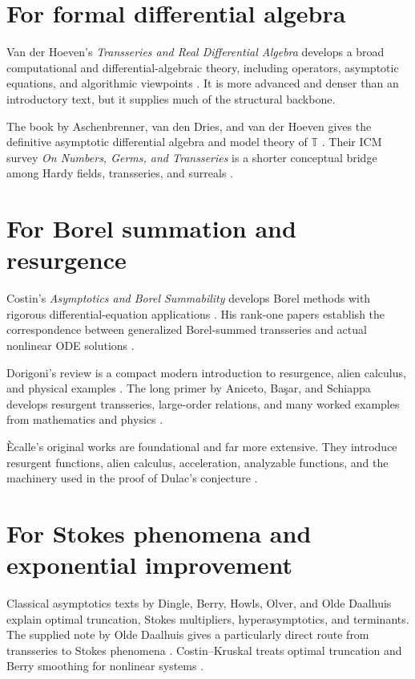 \documentclass[11pt,openany]{book}
\theoremstyle{definition}
\theoremstyle{plain}
\theoremstyle{remark}
\newcommand{\T}{\mathbb{T}}
\begin{document}
\section{For formal differential algebra}

Van der Hoeven's \emph{Transseries and Real Differential Algebra} develops a broad computational and differential-algebraic theory, including operators, asymptotic equations, and algorithmic viewpoints \cite{vdhoeven-book}. It is more advanced and denser than an introductory text, but it supplies much of the structural backbone.

The book by Aschenbrenner, van den Dries, and van der Hoeven gives the definitive asymptotic differential algebra and model theory of $\T$ \cite{adh-book}. Their ICM survey \emph{On Numbers, Germs, and Transseries} is a shorter conceptual bridge among Hardy fields, transseries, and surreals \cite{adh-numbers}.

\section{For Borel summation and resurgence}

Costin's \emph{Asymptotics and Borel Summability} develops Borel methods with rigorous differential-equation applications \cite{costin-book}. His rank-one papers establish the correspondence between generalized Borel-summed transseries and actual nonlinear ODE solutions \cite{costin-1995,costin-1998,costin-borel-stokes}.

Dorigoni's review is a compact modern introduction to resurgence, alien calculus, and physical examples \cite{dorigoni}. The long primer by Aniceto, Ba\c{s}ar, and Schiappa develops resurgent transseries, large-order relations, and many worked examples from mathematics and physics \cite{abs-primer}.

\`Ecalle's original works are foundational and far more extensive. They introduce resurgent functions, alien calculus, acceleration, analyzable functions, and the machinery used in the proof of Dulac's conjecture \cite{ecalle-resurgent,ecalle-analyzable}.

\section{For Stokes phenomena and exponential improvement}

Classical asymptotics texts by Dingle, Berry, Howls, Olver, and Olde Daalhuis explain optimal truncation, Stokes multipliers, hyperasymptotics, and terminants. The supplied note by Olde Daalhuis gives a particularly direct route from transseries to Stokes phenomena \cite{olde-daalhuis}. Costin--Kruskal treats optimal truncation and Berry smoothing for nonlinear systems \cite{costin-kruskal}.
\end{document}
